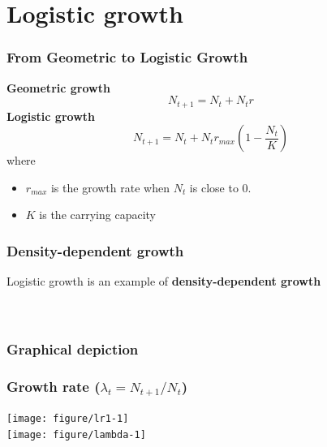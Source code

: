 \documentclass[color=usenames,dvipsnames]{beamer}\usepackage[]{graphicx}\usepackage[]{xcolor}
\begin{document}
\section{Logistic growth}


\begin{frame}
  \frametitle{From Geometric to Logistic Growth}
  \large
  {\bf Geometric growth}
  \[
    N_{t+1} = N_t + N_tr
  \]
  \pause
  {\bf Logistic growth}
  \[
    N_{t+1} = N_t + N_t r_{max}\left(1 - \frac{N_t}{K}\right)
  \]
  where \\
  \begin{itemize}
    \item $r_{max}$ is the growth rate when $N_t$ is close to 0. \\
    \item $K$ is the carrying capacity
  \end{itemize}
\end{frame}





\begin{frame}
  \frametitle{Density-dependent growth}
  \large
  Logistic growth is an example of {\bf density-dependent
    growth} \\
  \vspace{0.5cm}
   \\
  \vspace{0.5cm}
   \\
\end{frame}




\begin{frame}[fragile]
  \frametitle{Graphical depiction}




\vspace{-1cm}
\begin{center}
\end{center}
\end{frame}








\begin{frame}[fragile]
  \frametitle{Growth rate ($\lambda_t = N_{t+1}/N_t$)}


\begin{center}
  \texttt{[image: figure/lr1-1]} \\ \vfill
  \texttt{[image: figure/lambda-1]}
\end{center}
\end{frame}
\end{document}
